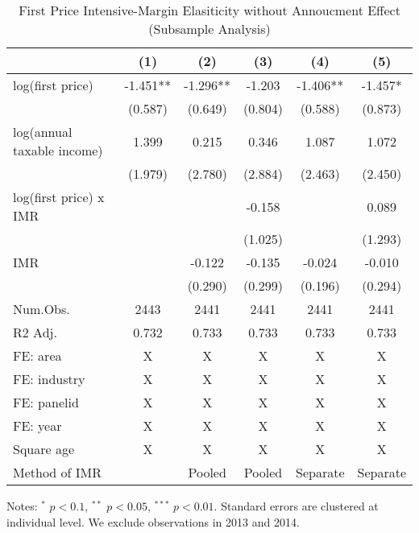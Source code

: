 \documentclass[
  11pt,
  a4paper,
]{article}
\begin{document}
\begin{table}

\caption{\label{tab:robustbenchmark1}First Price Intensive-Margin Elasiticity without Annoucment Effect (Subsample Analysis)}
\centering
\fontsize{9}{11}\selectfont
\begin{threeparttable}
\begin{tabular}[t]{lccccc}
\toprule
  & (1) & (2) & (3) & (4) & (5)\\
\midrule
log(first price) & -1.451** & -1.296** & -1.203 & -1.406** & -1.457*\\
 & (0.587) & (0.649) & (0.804) & (0.588) & (0.873)\\
log(annual taxable income) & 1.399 & 0.215 & 0.346 & 1.087 & 1.072\\
 & (1.979) & (2.780) & (2.884) & (2.463) & (2.450)\\
log(first price) x IMR &  &  & -0.158 &  & 0.089\\
 &  &  & (1.025) &  & (1.293)\\
IMR &  & -0.122 & -0.135 & -0.024 & -0.010\\
 &  & (0.290) & (0.299) & (0.196) & (0.294)\\
\midrule
Num.Obs. & 2443 & 2441 & 2441 & 2441 & 2441\\
R2 Adj. & 0.732 & 0.733 & 0.733 & 0.733 & 0.733\\
FE: area & X & X & X & X & X\\
FE: industry & X & X & X & X & X\\
FE: panelid & X & X & X & X & X\\
FE: year & X & X & X & X & X\\
Square age & X & X & X & X & X\\
Method of IMR &  & Pooled & Pooled & Separate & Separate\\
\bottomrule
\end{tabular}
\begin{tablenotes}
\item Notes: $^{*}$ $p < 0.1$, $^{**}$ $p < 0.05$, $^{***}$ $p < 0.01$. Standard errors are clustered at individual level. We exclude observations in 2013 and 2014.
\end{tablenotes}
\end{threeparttable}
\end{table}
\end{document}
